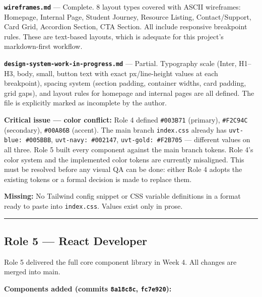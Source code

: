 \documentclass[12pt,a4paper]{article}
\begin{document}
\textbf{\texttt{wireframes.md}} --- Complete. 8 layout types covered
with ASCII wireframes: Homepage, Internal Page, Student Journey,
Resource Listing, Contact/Support, Card Grid, Accordion Section, CTA
Section. All include responsive breakpoint rules. These are text-based
layouts, which is adequate for this project's markdown-first workflow.

\textbf{\texttt{design-system-work-in-progress.md}} --- Partial.
Typography scale (Inter, H1--H3, body, small, button text with exact
px/line-height values at each breakpoint), spacing system (section
padding, container widths, card padding, grid gaps), and layout rules
for homepage and internal pages are all defined. The file is explicitly
marked as incomplete by the author.

\textbf{Critical issue --- color conflict:} Role 4 defined
\texttt{\#003B71} (primary), \texttt{\#F2C94C} (secondary),
\texttt{\#00A86B} (accent). The main branch \texttt{index.css} already
has \texttt{uvt-blue:\ \#005BBB}, \texttt{uvt-navy:\ \#002147},
\texttt{uvt-gold:\ \#F2B705} --- different values on all three. Role 5
built every component against the main branch tokens. Role 4's color
system and the implemented color tokens are currently misaligned. This
must be resolved before any visual QA can be done: either Role 4 adopts
the existing tokens or a formal decision is made to replace them.

\textbf{Missing:} No Tailwind config snippet or CSS variable definitions
in a format ready to paste into \texttt{index.css}. Values exist only in
prose.

\medskip\noindent\textcolor{uvtYellow}{\rule{\textwidth}{1.2pt}}\medskip

\subsection{Role 5 --- React Developer}\label{role-5-react-developer}

Role 5 delivered the full core component library in Week 4. All changes
are merged into main.

\textbf{Components added (commits \texttt{8a18c8c}, \texttt{fc7e920}):}
\end{document}
